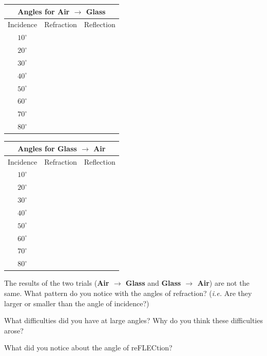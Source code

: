 \documentclass[10pt]{exam}
\begin{document}
\begin{multicols}{2}
  \begin{tabular}{|c|c|c|}
    \hline
    \multicolumn{3}{|c|}{Angles for {\bf Air $\rightarrow$ Glass}} 
    \\\hline
    Incidence &
    Refraction &
    Reflection \\\hline
    $10^\circ$ && \\\hline
    $20^\circ$ && \\\hline
    $30^\circ$ && \\\hline
    $40^\circ$ && \\\hline
    $50^\circ$ && \\\hline
    $60^\circ$ && \\\hline
    $70^\circ$ && \\\hline
    $80^\circ$ && \\\hline
  \end{tabular}

  \columnbreak

  \begin{tabular}{|c|c|c|}
    \hline
    \multicolumn{3}{|c|}{Angles for {\bf Glass $\rightarrow$ Air}} 
    \\\hline
    Incidence &
    Refraction &
    Reflection \\\hline
    $10^\circ$ && \\\hline
    $20^\circ$ && \\\hline
    $30^\circ$ && \\\hline
    $40^\circ$ && \\\hline
    $50^\circ$ && \\\hline
    $60^\circ$ && \\\hline
    $70^\circ$ && \\\hline
    $80^\circ$ && \\\hline
  \end{tabular}


\end{multicols}

\vspace{-1em}
\begin{questions}


  \question
    The results of the two trials ({\bf Air $\rightarrow$ Glass} and {\bf Glass $\rightarrow$ Air}) are not the same.  What pattern do you notice with the angles of refraction? (\emph{i.e.} Are they larger or smaller than the angle of incidence?)
    \vs
  
  \question
    What difficulties did you have at large angles?  Why do you think these difficulties arose?
    \vs 
  
  \question
    What did you notice about the angle of reFLECtion?
    \vs 



\end{questions}
\end{document}
